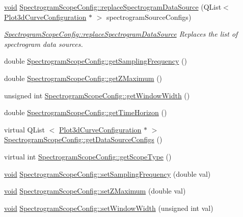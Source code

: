 \begin{DoxyCompactItemize}
\item 
\hyperlink{group___u_a_v_objects_plugin_ga444cf2ff3f0ecbe028adce838d373f5c}{void} \hyperlink{group___scope_plugin_ga3202b61b6cde085652ea649879e48c63}{\-Spectrogram\-Scope\-Config\-::replace\-Spectrogram\-Data\-Source} (\-Q\-List$<$ \hyperlink{struct_plot3d_curve_configuration}{\-Plot3d\-Curve\-Configuration} $\ast$ $>$ spectrogram\-Source\-Configs)
\begin{DoxyCompactList}\small\item\em \hyperlink{group___scope_plugin_ga3202b61b6cde085652ea649879e48c63}{\-Spectrogram\-Scope\-Config\-::replace\-Spectrogram\-Data\-Source} \-Replaces the list of spectrogram data sources. \end{DoxyCompactList}\item 
double \hyperlink{group___scope_plugin_ga4fb9d3be277337c045b46845bab20f39}{\-Spectrogram\-Scope\-Config\-::get\-Sampling\-Frequency} ()
\item 
double \hyperlink{group___scope_plugin_ga953b8cd98a71026b132ddace51d3111a}{\-Spectrogram\-Scope\-Config\-::get\-Z\-Maximum} ()
\item 
unsigned int \hyperlink{group___scope_plugin_ga38591d941f9fabb469887d48006a629c}{\-Spectrogram\-Scope\-Config\-::get\-Window\-Width} ()
\item 
double \hyperlink{group___scope_plugin_gabf7ca6406f6b5affaf769e09e633a101}{\-Spectrogram\-Scope\-Config\-::get\-Time\-Horizon} ()
\item 
virtual \-Q\-List\*
$<$ \hyperlink{struct_plot3d_curve_configuration}{\-Plot3d\-Curve\-Configuration} $\ast$ $>$ \hyperlink{group___scope_plugin_ga20cd38fb6f34eae6a7a5c9e18a2184ba}{\-Spectrogram\-Scope\-Config\-::get\-Data\-Source\-Configs} ()
\item 
virtual int \hyperlink{group___scope_plugin_gab53e8753102217ba194ab539f0892bd7}{\-Spectrogram\-Scope\-Config\-::get\-Scope\-Type} ()
\item 
\hyperlink{group___u_a_v_objects_plugin_ga444cf2ff3f0ecbe028adce838d373f5c}{void} \hyperlink{group___scope_plugin_ga3e3207be4ff4a10b7ec3df051d76c3f6}{\-Spectrogram\-Scope\-Config\-::set\-Sampling\-Frequency} (double val)
\item 
\hyperlink{group___u_a_v_objects_plugin_ga444cf2ff3f0ecbe028adce838d373f5c}{void} \hyperlink{group___scope_plugin_ga4f71e9c45cd8cbebb11505f9f6d18a42}{\-Spectrogram\-Scope\-Config\-::set\-Z\-Maximum} (double val)
\item 
\hyperlink{group___u_a_v_objects_plugin_ga444cf2ff3f0ecbe028adce838d373f5c}{void} \hyperlink{group___scope_plugin_gaf3bc69a747cec5908674e2df1118cd82}{\-Spectrogram\-Scope\-Config\-::set\-Window\-Width} (unsigned int val)

\end{DoxyCompactItemize}

